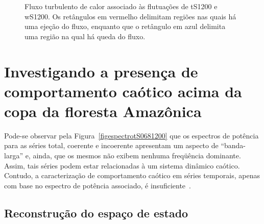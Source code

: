 \begin{figure}[ht]
\centering {}
\caption{Fluxo turbulento de calor associado às flutuações de tS1200 e wS1200. Os retângulos em vermelho delimitam regiões nas quais há uma ejeção do fluxo, enquanto que o retângulo em azul delimita uma região na qual há queda do fluxo.}
\label{figfluxo}
\end{figure}

\section{Investigando a presença de comportamento caótico acima da copa da floresta Amazônica}


Pode-se observar pela Figura~\ref{figespectrotS0681200} que os espectros de potência para as séries total, coerente e incoerente apresentam um aspecto de ``banda-larga'' e, ainda, que os mesmos não exibem nenhuma freqüência dominante. Assim, tais séries podem estar relacionadas à um sistema dinâmico caótico. Contudo, a caracterização de comportamento caótico em séries temporais, apenas com base no espectro de potência associado, é insuficiente~\cite{tufillaro/92}. 

\subsection{Reconstrução do espaço de estado}

